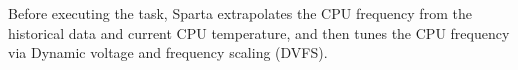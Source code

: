 Before executing the task, Sparta extrapolates the CPU frequency from the historical data and current CPU temperature, and then tunes the CPU frequency via Dynamic voltage and frequency scaling (DVFS).